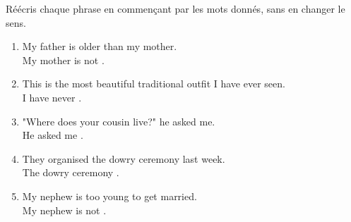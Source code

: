 \documentclass[11pt]{article}
\begin{document}
\begin{exercice}
Réécris chaque phrase en commençant par les mots donnés, sans en changer le sens.
\begin{enumerate}
    \item My father is older than my mother. \\
    My mother is not \underline{\hspace{5cm}}.
    \item This is the most beautiful traditional outfit I have ever seen. \\
    I have never \underline{\hspace{5cm}}.
    \item "Where does your cousin live?" he asked me. \\
    He asked me \underline{\hspace{5cm}}.
    \item They organised the dowry ceremony last week. \\
    The dowry ceremony \underline{\hspace{5cm}}.
    \item My nephew is too young to get married. \\
    My nephew is not \underline{\hspace{5cm}}.
\end{enumerate}
\end{exercice}
\end{document}

